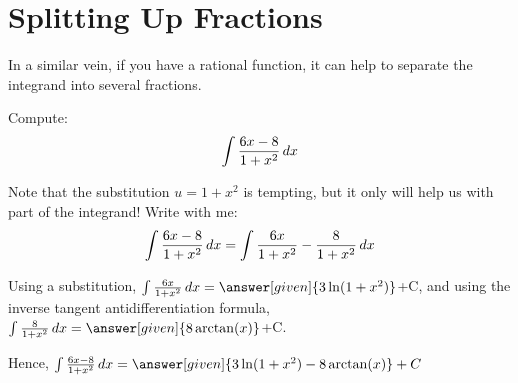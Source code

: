 \documentclass[nooutcomes]{ximera}
\begin{document}
%

\section{Splitting Up Fractions}

In a similar vein, if you have a rational function, it can help to separate the
integrand into several fractions.

\begin{example}
  Compute:
  \[
  \int \frac{6x-8}{1+x^2}\mathop{}\!d x
  \]
 
  \begin{explanation}
    Note that the substitution $u= 1+x^2$ is tempting, but it only will help us with part of the integrand!  Write with me:
    \[ \int \frac{6x-8}{1+x^2}\mathop{}\!d x = \int \frac{6x}{1+x^2}-\frac{8}{1+x^2} \mathop{}\!d x \]
      
Using a substitution, $ \int \frac{6x}{1+x^2}\d x = \answer[given]{3 \ln(1+x^2)}$+C, and using the inverse tangent antidifferentiation formula, $ \int \frac{8}{1+x^2}\d x = \answer[given]{8 \arctan(x)}$+C.

Hence, $\int \frac{6x-8}{1+x^2}\d x =  \answer[given]{3 \ln(1+x^2)- 8 \arctan(x)}+C$
  \end{explanation}
\end{example}
\end{document}

